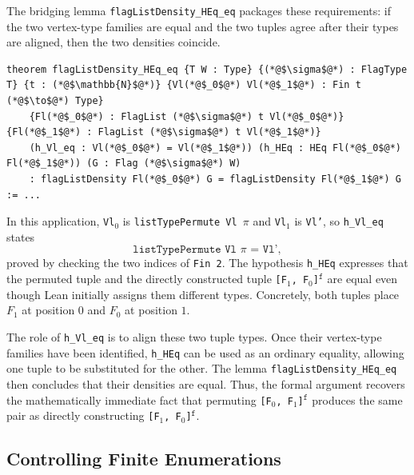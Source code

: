\documentclass{article}
\newcommand{\lean}[1]{\texttt{#1}}
\begin{document}
The bridging lemma \lean{flagListDensity\_HEq\_eq} packages these
requirements: if the two vertex-type families are equal and the two tuples
agree after their types are aligned, then the two densities coincide.
\begin{lstlisting}
theorem flagListDensity_HEq_eq {T W : Type} {(*@$\sigma$@*) : FlagType T} {t : (*@$\mathbb{N}$@*)} {Vl(*@$_0$@*) Vl(*@$_1$@*) : Fin t (*@$\to$@*) Type}
    {Fl(*@$_0$@*) : FlagList (*@$\sigma$@*) t Vl(*@$_0$@*)} {Fl(*@$_1$@*) : FlagList (*@$\sigma$@*) t Vl(*@$_1$@*)}
    (h_Vl_eq : Vl(*@$_0$@*) = Vl(*@$_1$@*)) (h_HEq : HEq Fl(*@$_0$@*) Fl(*@$_1$@*)) (G : Flag (*@$\sigma$@*) W)
    : flagListDensity Fl(*@$_0$@*) G = flagListDensity Fl(*@$_1$@*) G := ...
\end{lstlisting}
In this application, \lean{Vl}$_0$ is
\lean{listTypePermute Vl $\pi$} and \lean{Vl}$_1$ is \lean{Vl'}, so
\lean{h\_Vl\_eq} states
\[
  \lean{listTypePermute Vl $\pi$ = Vl'},
\]
proved by checking the two indices of \lean{Fin 2}.  The hypothesis
\lean{h\_HEq} expresses that the permuted tuple and the directly constructed
tuple \lean{[F}$_1$\lean{, F}$_0$\lean{]}$^{\mathtt{f}}$ are equal even
though Lean initially assigns them different types.  Concretely, both tuples
place $F_1$ at position $0$ and $F_0$ at position $1$.

The role of \lean{h\_Vl\_eq} is to align these two tuple types.  Once their
vertex-type families have been identified, \lean{h\_HEq} can be used as an
ordinary equality, allowing one tuple to be substituted for the other.  The
lemma \lean{flagListDensity\_HEq\_eq} then concludes that their densities are
equal.  Thus, the formal argument recovers the mathematically immediate fact
that permuting \lean{[F}$_0$\lean{, F}$_1$\lean{]}$^{\mathtt{f}}$ produces
the same pair as directly constructing
\lean{[F}$_1$\lean{, F}$_0$\lean{]}$^{\mathtt{f}}$.

\subsection{Controlling Finite Enumerations}
\label{sec:fintype}
\end{document}
